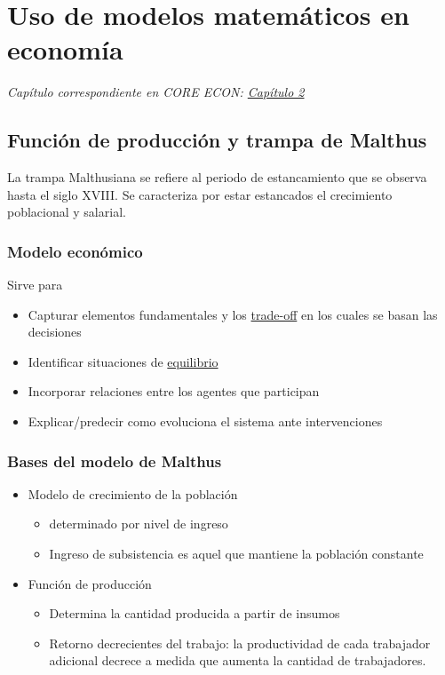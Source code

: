 \section{Uso de modelos matemáticos en economía}
\textit{Capítulo correspondiente en CORE ECON: \href{https://www.core-econ.org/the-economy/book/es/text/02.html}{Capítulo 2}}

\subsection{Función de producción y trampa de Malthus}
La trampa Malthusiana se refiere al periodo de estancamiento que se observa hasta el siglo XVIII. Se caracteriza por estar estancados el crecimiento poblacional y salarial.

\subsubsection{Modelo económico}
Sirve para
\begin{itemize}
    \item Capturar elementos fundamentales y los \hyperlink{trade-off}{trade-off} en los cuales se basan las decisiones
    \item Identificar situaciones de \hyperlink{equilibrio}{equilibrio}
    \item Incorporar relaciones entre los agentes que participan
    \item Explicar/predecir como evoluciona el sistema ante intervenciones
\end{itemize}

\subsubsection{Bases del modelo de Malthus}
\begin{itemize}
    \item Modelo de crecimiento de la población
    \begin{itemize}
        \item determinado por nivel de ingreso
        \item Ingreso de subsistencia es aquel que mantiene la población constante
    \end{itemize}
    \item Función de producción
    \begin{itemize}
        \item Determina la cantidad producida a partir de insumos
        \item Retorno decrecientes del trabajo: la productividad de cada trabajador adicional decrece a medida que aumenta la cantidad de trabajadores.
    \end{itemize}
\end{itemize}

